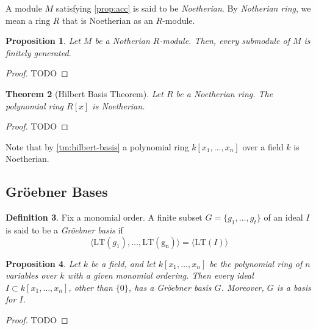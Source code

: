 \documentclass{amsart}
\newtheorem{theorem}{Theorem}[section]
\newtheorem{proposition}[theorem]{Proposition}
\theoremstyle{definition}
\newtheorem{definition}[theorem]{Definition}
\theoremstyle{remark}
\numberwithin{equation}{section}
\begin{document}
{A module $M$ satisfying \cref{prop:acc} is said to be \emph{Noetherian}. By \emph{Notherian ring}, we mean a ring $R$ that is Noetherian as an $R$-module.

\begin{proposition}
  Let $M$ be a Notherian $R$-module. Then, every submodule of $M$ is finitely generated.
\end{proposition}

\begin{proof}
  TODO
\end{proof}

\begin{theorem}[Hilbert Basis Theorem]
  \label{thm:hilbert-basis}
  Let $R$ be a Noetherian ring. The polynomial ring $R[x]$ is Noetherian.
\end{theorem}

\begin{proof}
  TODO
\end{proof}

Note that by \cref{tm:hilbert-basis} a polynomial ring $k[x_1, \ldots, x_n]$ over a field $k$ is Noetherian.

\subsection{Gr\"oebner Bases}

\leavevmode


\begin{definition}
  Fix a monomial order. A finite subset $G = \{ g_1, \ldots, g_t \}$ of an ideal $I$ is said to be a \emph{Gr\"oebner basis} if
  \begin{equation*}
    \langle \mathrm{LT}(g_1), \ldots, \mathrm{LT(g_n)} \rangle = \langle \mathrm{LT}(I) \rangle
  \end{equation*}
\end{definition}

\begin{proposition}
  Let $k$ be a field, and let $k[x_1, \ldots, x_n]$ be the polynomial ring of $n$ variables over $k$ with a given monomial ordering. Then every ideal $I \subset k[x_1, \ldots, x_n]$, other than $\{ 0 \}$, has a Gr\"oebner basis $G$. Moreover, $G$ is a basis for $I$.
\end{proposition}

\begin{proof}
  TODO
\end{proof}

}
\end{document}
